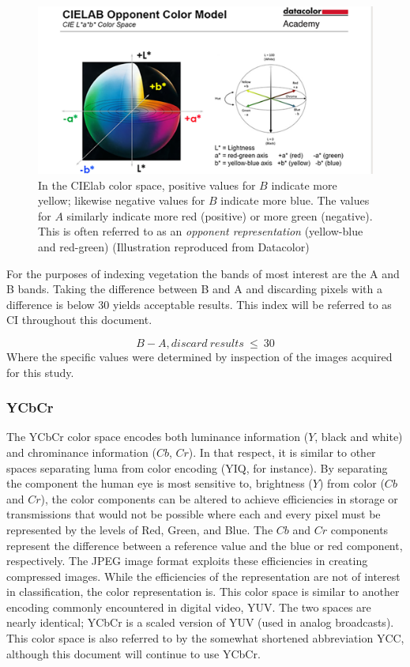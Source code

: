 \documentclass[letterpaper, notitlepage]{report}
\begin{document}
{\begin{figure}[H]
	\centering
	\includegraphics[width=.65\linewidth]{./figures/cielab-colorspace.png}
	\caption[CIElab color space]{In the CIElab color space, positive values for $B$ indicate more yellow; likewise negative values for $B$ indicate more blue. The values for $A$ similarly indicate more red (positive) or more green (negative). This is often referred to as an \textit{opponent representation} (yellow-blue and red-green) (Illustration reproduced from Datacolor)}
	\label{fig:cielab}	
\end{figure}

 For the purposes of indexing vegetation the bands of  most interest are the A and B bands. Taking the difference between B and A and discarding pixels with a difference is below 30 yields acceptable results. This index will be referred to as CI throughout this document.

\begin{equation}\label{eqn:index-cielab}
		B - A, discard~results~\leq~30
\end{equation}
Where the specific values were determined by inspection of the images acquired for this study.

\subsubsection{YCbCr}
\label{section:ycbcri}
The YCbCr color space encodes both luminance information ($Y$, black and white) and chrominance information ($Cb$, $Cr$). In that respect, it is similar to other spaces separating luma from color encoding (YIQ, for instance). By separating the component the human eye is most sensitive to, brightness ($Y$) from color ($Cb$ and $Cr$), the color components can be altered to achieve efficiencies in storage or transmissions that would not be possible where each and every pixel must be represented by the levels of Red, Green, and Blue.  The $Cb$ and $Cr$ components represent the difference between a reference value and the blue or red component, respectively. The JPEG image format exploits these efficiencies in creating compressed images. While the efficiencies of the representation are not of interest in classification, the color representation is. This color space is similar to another encoding commonly encountered in digital video, YUV. The two spaces are nearly identical; YCbCr is a scaled version of YUV (used in analog broadcasts). This color space is also referred to by the somewhat shortened abbreviation YCC, although this document will continue to use YCbCr.

}
\end{document}

